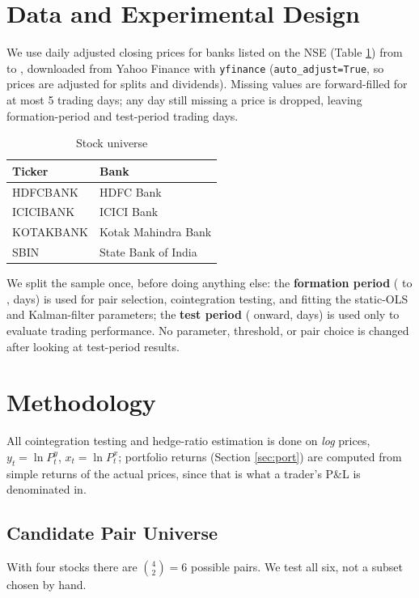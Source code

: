 \documentclass[11pt,a4paper]{article}
\begin{document}
\section{Data and Experimental Design}\label{sec:data}

We use daily adjusted closing prices for \NTickers{} banks listed on the NSE (Table \ref{tab:universe}) from \DataStart{} to \DataEnd{}, downloaded from Yahoo Finance with \texttt{yfinance} (\texttt{auto\_adjust=True}, so prices are adjusted for splits and dividends). Missing values are forward-filled for at most 5 trading days; any day still missing a price is dropped, leaving \NFormation{} formation-period and \NTest{} test-period trading days.

\begin{table}[H]
\centering
\caption{Stock universe}
\label{tab:universe}
\begin{tabular}{ll}
\toprule
Ticker & Bank \\
\midrule
HDFCBANK & HDFC Bank \\
ICICIBANK & ICICI Bank \\
KOTAKBANK & Kotak Mahindra Bank \\
SBIN & State Bank of India \\
\bottomrule
\end{tabular}
\end{table}

We split the sample once, before doing anything else: the \textbf{formation period} (\DataStart{} to \FormationEnd{}, \NFormation{} days) is used for pair selection, cointegration testing, and fitting the static-OLS and Kalman-filter parameters; the \textbf{test period} (\TestStart{} onward, \NTest{} days) is used only to evaluate trading performance. No parameter, threshold, or pair choice is changed after looking at test-period results.

\section{Methodology}\label{sec:method}

All cointegration testing and hedge-ratio estimation is done on \emph{log} prices, $y_t = \ln P^y_t$, $x_t = \ln P^x_t$; portfolio returns (Section \ref{sec:port}) are computed from simple returns of the actual prices, since that is what a trader's P\&L is denominated in.

\subsection{Candidate Pair Universe}
With four stocks there are $\binom{4}{2}=6$ possible pairs. We test all six, not a subset chosen by hand.
\end{document}
